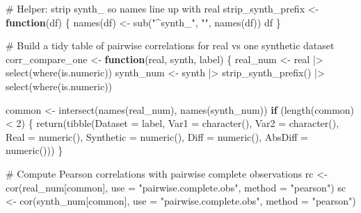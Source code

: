 \documentclass[
  letterpaper,
  DIV=11,
  numbers=noendperiod]{scrartcl}
\newenvironment{Shaded}{\begin{snugshade}}{\end{snugshade}}
\newcommand{\AttributeTok}[1]{\textcolor[rgb]{0.40,0.45,0.13}{#1}}
\newcommand{\CommentTok}[1]{\textcolor[rgb]{0.37,0.37,0.37}{#1}}
\newcommand{\ControlFlowTok}[1]{\textcolor[rgb]{0.00,0.23,0.31}{\textbf{#1}}}
\newcommand{\DecValTok}[1]{\textcolor[rgb]{0.68,0.00,0.00}{#1}}
\newcommand{\FunctionTok}[1]{\textcolor[rgb]{0.28,0.35,0.67}{#1}}
\newcommand{\NormalTok}[1]{\textcolor[rgb]{0.00,0.23,0.31}{#1}}
\newcommand{\OtherTok}[1]{\textcolor[rgb]{0.00,0.23,0.31}{#1}}
\newcommand{\SpecialCharTok}[1]{\textcolor[rgb]{0.37,0.37,0.37}{#1}}
\newcommand{\StringTok}[1]{\textcolor[rgb]{0.13,0.47,0.30}{#1}}
\begin{document}
\begin{Shaded}
\begin{Highlighting}[]
\CommentTok{\# Helper: strip \textquotesingle{}synth\_\textquotesingle{} so names line up with real}
\NormalTok{strip\_synth\_prefix }\OtherTok{\textless{}{-}} \ControlFlowTok{function}\NormalTok{(df) \{}
  \FunctionTok{names}\NormalTok{(df) }\OtherTok{\textless{}{-}} \FunctionTok{sub}\NormalTok{(}\StringTok{"\^{}synth\_"}\NormalTok{, }\StringTok{""}\NormalTok{, }\FunctionTok{names}\NormalTok{(df))}
\NormalTok{  df}
\NormalTok{\}}

\CommentTok{\# Build a tidy table of pairwise correlations for real vs one synthetic dataset}
\NormalTok{corr\_compare\_one }\OtherTok{\textless{}{-}} \ControlFlowTok{function}\NormalTok{(real, synth, label) \{}
\NormalTok{  real\_num  }\OtherTok{\textless{}{-}}\NormalTok{ real }\SpecialCharTok{|\textgreater{}} \FunctionTok{select}\NormalTok{(}\FunctionTok{where}\NormalTok{(is.numeric))}
\NormalTok{  synth\_num }\OtherTok{\textless{}{-}}\NormalTok{ synth }\SpecialCharTok{|\textgreater{}} \FunctionTok{strip\_synth\_prefix}\NormalTok{() }\SpecialCharTok{|\textgreater{}} \FunctionTok{select}\NormalTok{(}\FunctionTok{where}\NormalTok{(is.numeric))}

\NormalTok{  common }\OtherTok{\textless{}{-}} \FunctionTok{intersect}\NormalTok{(}\FunctionTok{names}\NormalTok{(real\_num), }\FunctionTok{names}\NormalTok{(synth\_num))}
  \ControlFlowTok{if}\NormalTok{ (}\FunctionTok{length}\NormalTok{(common) }\SpecialCharTok{\textless{}} \DecValTok{2}\NormalTok{) \{}
    \FunctionTok{return}\NormalTok{(}\FunctionTok{tibble}\NormalTok{(}\AttributeTok{Dataset =}\NormalTok{ label, }\AttributeTok{Var1 =} \FunctionTok{character}\NormalTok{(), }\AttributeTok{Var2 =} \FunctionTok{character}\NormalTok{(),}
                  \AttributeTok{Real =} \FunctionTok{numeric}\NormalTok{(), }\AttributeTok{Synthetic =} \FunctionTok{numeric}\NormalTok{(), }\AttributeTok{Diff =} \FunctionTok{numeric}\NormalTok{(), }\AttributeTok{AbsDiff =} \FunctionTok{numeric}\NormalTok{()))}
\NormalTok{  \}}

  \CommentTok{\# Compute Pearson correlations with pairwise complete observations}
\NormalTok{  rc }\OtherTok{\textless{}{-}} \FunctionTok{cor}\NormalTok{(real\_num[common],  }\AttributeTok{use =} \StringTok{"pairwise.complete.obs"}\NormalTok{, }\AttributeTok{method =} \StringTok{"pearson"}\NormalTok{)}
\NormalTok{  sc }\OtherTok{\textless{}{-}} \FunctionTok{cor}\NormalTok{(synth\_num[common], }\AttributeTok{use =} \StringTok{"pairwise.complete.obs"}\NormalTok{, }\AttributeTok{method =} \StringTok{"pearson"}\NormalTok{)}


\end{Highlighting}
\end{Shaded}
\end{document}
